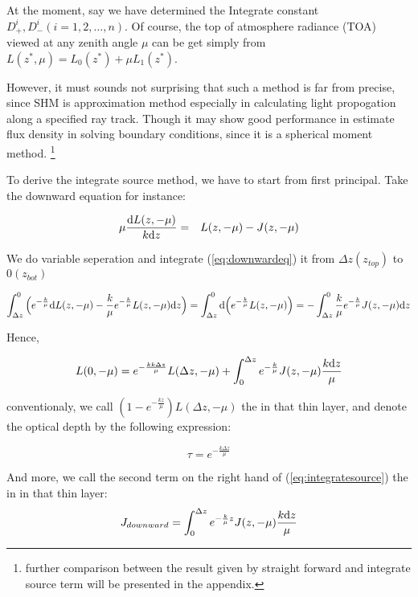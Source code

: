 \documentclass[a4paper]{report}
\begin{document}
At the moment, say we have determined the Integrate constant $D_{+}^{i}, D_{-}^{i}(i=1, 2, \ldots, n)$.
Of course, the top of atmosphere radiance (TOA) viewed at any zenith angle $\mu$ can be get simply from
$L(z^{*}, \mu) = L_{0}(z^{*}) + \mu L_{1}(z^{*})$.

However, it must sounds not surprising that such a method is far from precise, since SHM is approximation method
especially in calculating light propogation along a specified ray track. Though it may show good performance
in estimate flux density in solving boundary conditions, since it is a spherical moment method.
\footnote{further comparison between the result given by straight forward and 
integrate source term will be presented in the appendix.}

To derive the integrate source method, we have to start from first principal.
Take the downward equation for instance: 

\begin{eqnarray} \label{eq:downwardeq}
    \mu \frac{\mathrm{d} L(z, -\mu)}{k \mathrm{d} z} & = & 
    L(z, -\mu) - J(z, -\mu)
\end{eqnarray}

We do variable seperation and 
integrate (\ref{eq:downwardeq}) it from $\Delta z(z_{top})$ to $0 (z_{bot})$ 

\begin{displaymath}
\int_{\Delta z}^{0} \Big(
    e^{-\frac{k}{\mu}} \mathrm{d} L(z, -\mu) - \frac{k}{\mu}e^{-\frac{k}{\mu}}L(z, -\mu)\mathrm{d} z
    \Big) = 
\int_{\Delta z}^{0}\mathrm{d}\Big(
    e^{-\frac{k}{\mu}}L(z, -\mu)
    \Big) = 
-\int_{\Delta z}^{0}
    \frac{k}{\mu}e^{-\frac{k}{\mu}}J(z, -\mu)\mathrm{d} z
\end{displaymath}

Hence,

\begin{equation} \label{eq:integratesource}
    L(0, -\mu) = e^{-\frac{kk\Delta z}{\mu}}L(\Delta z, -\mu) + \int_{0}^{\Delta z}
    e^{-\frac{k}{\mu}}J(z, -\mu)\frac{k\mathrm{d} z}{\mu}
\end{equation}

conventionaly, we call $(1 - e^{-\frac{kz}{\mu}})L(\Delta z, -\mu)$ the  in that thin layer, and denote the optical depth by the following expression:

\begin{equation} \label{eq:tau}
    \tau = e^{-\frac{k\Delta z}{\mu}}
\end{equation}

And more, we call the second term on the right hand of (\ref{eq:integratesource}) the  in
in that thin layer: 
\begin{equation} \label{eq:jdo}
    J_{downward} = \int_{0}^{\Delta z}
    e^{-\frac{k}{\mu}z}J(z, -\mu)\frac{k\mathrm{d} z}{\mu}
\end{equation}
\end{document}
